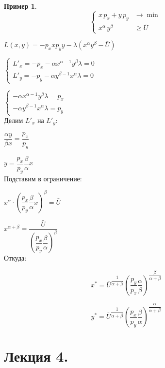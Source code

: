 \documentclass[reqno]{article}
\theoremstyle{definition}
\theoremstyle{definition}
\theoremstyle{definition}
\newtheorem*{exmp}{Пример}
\theoremstyle{definition}
\theoremstyle{definition}
\theoremstyle{definition}
\theoremstyle{definition}
\theoremstyle{definition}
\theoremstyle{definition}
\begin{document}
	\begin{exmp}
		$$\begin{cases}
			x\,p_x + y\,p_y &\rightarrow \min\\
			
			x^\alpha\,y^\beta& \geq \bar{U}
		\end{cases}$$
		
		$L(x,y)=-p_x x p_y y - \lambda (x^\alpha y^\beta - \bar{U})$
		
		$\begin{cases}
			L'_x=-p_x - \alpha x^{\alpha - 1} y^\beta \lambda =0\\
			
			L'_y=-p_y - \alpha y^{\beta - 1} x^\alpha \lambda =0
		\end{cases}$
		
		$\begin{cases}
			- \alpha x^{\alpha - 1} y^\beta \lambda = p_x\\
			
			- \alpha y^{\beta - 1} x^\alpha \lambda = p_y
		\end{cases}$\\ 
		
		Делим $L'_x$ на $L'_y$:
		
		$\dfrac{\alpha y}{\beta x} = \dfrac{p_x}{p_y}$
		
		$y=\dfrac{p_x}{p_y} \dfrac{\beta}{\alpha} x$\\
		
		Подставим в ограничение:
		
		$x^\alpha \cdot \left(\dfrac{p_x}{p_y} \dfrac{\beta}{\alpha} x \right)^\beta = \bar{U}$
		
		$x^{\alpha + \beta} = \dfrac{\bar{U}}{\left(\dfrac{p_x}{p_y} \dfrac{\beta}{\alpha} \right)^\beta}$\\
		
		Откуда:
		
		$$x^* = \bar{U}^{\dfrac{1}{\alpha + \beta}} \left(\dfrac{p_y}{p_x} \dfrac{\alpha}{\beta} \right)^{\dfrac{\beta}{\alpha + \beta}}$$  
		
		$$y^* = \bar{U}^{\dfrac{1}{\alpha + \beta}} \left(\dfrac{p_x}{p_y} \dfrac{\beta}{\alpha} \right)^{\dfrac{\alpha}{\alpha + \beta}}$$
				
		
	\end{exmp}
	
	\newpage
	
	\section{Лекция 4.}
	
\end{document}

